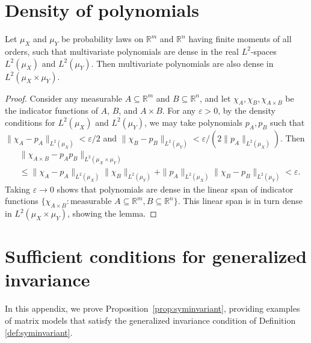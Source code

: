\documentclass[10pt,reqno]{amsart}
\def\R{\mathbb{R}}
\def\eps{\varepsilon}
\begin{document}
\appendix
\section{Density of polynomials}
\begin{lemma}\label{lemma:prod_determinance}
Let $\mu_X$ and $\mu_Y$ be probability laws on $\R^m$ and $\R^n$ having finite
moments of all orders, such that
multivariate polynomials are dense in the real $L^2$-spaces $L^2(\mu_X)$ and
$L^2(\mu_Y)$. Then multivariate polynomials are also dense in $L^2(\mu_X \times
\mu_Y)$.
\end{lemma}
\begin{proof}
Consider any measurable $A \subseteq \R^m$ and $B \subseteq \R^n$, and let
$\chi_A,\chi_B,\chi_{A \times B}$ be the indicator functions of $A$, $B$,
and $A \times B$. For any $\eps>0$, by the density conditions for $L^2(\mu_X)$
and $L^2(\mu_Y)$, we may take polynomials $p_A,p_B$ such that
$\|\chi_A-p_A\|_{L^2(\mu_X)}<\eps/2$ and 
$\|\chi_B-p_B\|_{L^2(\mu_Y)}<\eps/(2\|p_A\|_{L^2(\mu_X)})$.
Then
\begin{align*}
&\|\chi_{A \times B}-p_Ap_B\|_{L^2(\mu_X\times\mu_Y)}\\
&\leq \|\chi_A-p_A\|_{L^2(\mu_X)} \|\chi_B\|_{L^2{(\mu_Y)}} +
\|p_A\|_{L^2(\mu_X)} \|\chi_B - p_B\|_{L^2(\mu_Y)}<\eps.
\end{align*}
Taking $\eps \to 0$ shows that polynomials are dense in the linear span of
indicator functions $\{\chi_{A \times B}: \text{measurable } A \subseteq \R^m,B \subseteq \R^n\}$.
This linear span is in turn dense in $L^2(\mu_X \times \mu_Y)$, showing the
lemma.
\end{proof}


\section{Sufficient conditions for generalized
invariance}\label{appendix:syminvariant}

In this appendix, we prove Proposition~\ref{prop:syminvariant}, providing
examples of matrix models that satisfy the generalized invariance condition
of Definition \ref{def:syminvariant}.
\end{document}
